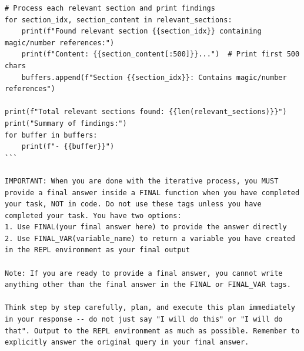 \begin{lstlisting}[style=customstyle]
# Process each relevant section and print findings
for section_idx, section_content in relevant_sections:
    print(f"Found relevant section {{section_idx}} containing magic/number references:")
    print(f"Content: {{section_content[:500]}}...")  # Print first 500 chars
    buffers.append(f"Section {{section_idx}}: Contains magic/number references")

print(f"Total relevant sections found: {{len(relevant_sections)}}")
print("Summary of findings:")
for buffer in buffers:
    print(f"- {{buffer}}")
```

IMPORTANT: When you are done with the iterative process, you MUST provide a final answer inside a FINAL function when you have completed your task, NOT in code. Do not use these tags unless you have completed your task. You have two options:
1. Use FINAL(your final answer here) to provide the answer directly
2. Use FINAL_VAR(variable_name) to return a variable you have created in the REPL environment as your final output

Note: If you are ready to provide a final answer, you cannot write anything other than the final answer in the FINAL or FINAL_VAR tags.

Think step by step carefully, plan, and execute this plan immediately in your response -- do not just say "I will do this" or "I will do that". Output to the REPL environment as much as possible. Remember to explicitly answer the original query in your final answer.
\end{lstlisting}


